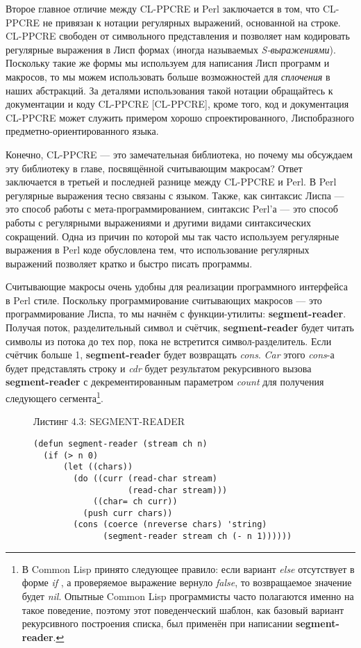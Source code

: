 Второе главное отличие между CL-PPCRE и Perl заключается в том, что CL-PPCRE не привязан к нотации регулярных выражений, основанной на строке. CL-PPCRE свободен от символьного представления и позволяет нам кодировать регулярные выражения в Лисп формах (иногда называемых \emph{S-выражениями}). Поскольку такие же формы мы используем для написания Лисп программ и макросов, то мы можем использовать больше возможностей для \emph{сплочения} в наших абстракций. За деталями использования такой нотации обращайтесь к документации и коду CL-PPCRE [CL-PPCRE], кроме того, код и документация CL-PPCRE может служить примером хорошо спроектированного, Лиспобразного предметно-ориентированного языка.

Конечно, CL-PPCRE --- это замечательная библиотека, но почему мы обсуждаем эту библиотеку в главе, посвящённой считывающим макросам? Ответ заключается в третьей и последней разнице между CL-PPCRE и Perl. В Perl регулярные выражения тесно связаны с языком. Также, как синтаксис Лиспа --- это способ работы с ме\-та-про\-грам\-ми\-ро\-ва\-нием, синтаксис Perl'а --- это способ работы с регулярными выражениями и другими видами синтаксических сокращений. Одна из причин по которой мы так часто используем регулярные выражения в Perl коде обусловлена тем, что использование регулярных выражений позволяет кратко и быстро писать программы.

Считывающие макросы очень удобны для реализации программного интерфейса в Perl стиле. Поскольку программирование считывающих макросов --- это программирование Лиспа, то мы начнём с функции-утилиты: \textbf{segment-reader}. Получая поток, разделительный символ и счётчик, \textbf{segment-reader} будет читать символы из потока до тех пор, пока не встретится символ-разделитель. Если счётчик больше 1, \textbf{segment-reader} будет возвращать \emph{cons}. \emph{Car} этого \emph{cons}-а будет представлять строку и \emph{cdr} будет результатом рекурсивного вызова \textbf{segment-reader} с декрементированным параметром \emph{count} для получения следующего сегмента\footnote{В Common Lisp принято следующее правило: если вариант \emph{else} отсутствует в форме \emph{if} , а проверяемое выражение вернуло \emph{false}, то возвращаемое значение будет \emph{nil}. Опытные Common Lisp программисты часто полагаются именно на такое поведение, поэтому этот поведенческий шаблон, как базовый вариант рекурсивного построения списка, был применён при написании \textbf{segment-reader}.}.

\begin{figure}Листинг 4.3: SEGMENT-READER\label{listing_4.3}
\listbegin
\begin{verbatim}
(defun segment-reader (stream ch n)
  (if (> n 0)
      (let ((chars))
        (do ((curr (read-char stream)
                   (read-char stream)))
            ((char= ch curr))
          (push curr chars))
        (cons (coerce (nreverse chars) 'string)
              (segment-reader stream ch (- n 1))))))
\end{verbatim}
\listend
\end{figure}

